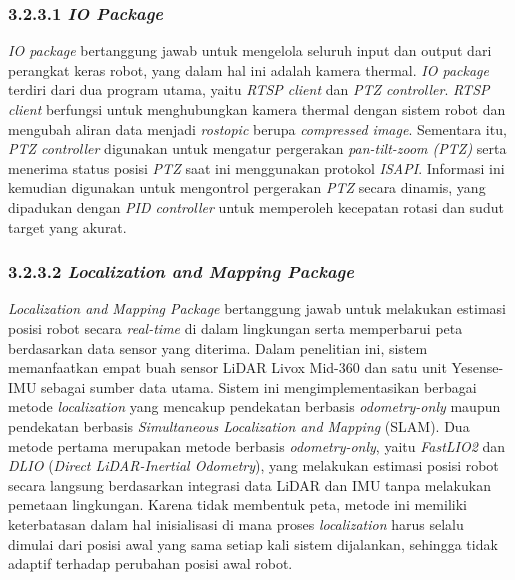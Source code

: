 \subsubsection{3.2.3.1 \emph{IO Package}}
\textit{IO package} bertanggung jawab untuk mengelola seluruh input dan output dari perangkat keras robot, yang dalam hal ini adalah kamera thermal. \textit{IO package} terdiri dari dua program utama, yaitu \textit{RTSP client} dan \textit{PTZ controller}.  \textit{RTSP client} berfungsi untuk menghubungkan kamera thermal dengan sistem robot dan mengubah aliran data menjadi \textit{rostopic} berupa \textit{compressed image}. Sementara itu, \textit{PTZ controller} digunakan untuk mengatur pergerakan \textit{pan-tilt-zoom (PTZ)} serta menerima status posisi \emph{PTZ} saat ini menggunakan protokol \emph{ISAPI}. Informasi ini kemudian digunakan untuk mengontrol pergerakan \emph{PTZ} secara dinamis, yang dipadukan dengan \textit{PID controller} untuk memperoleh kecepatan rotasi dan sudut target yang akurat.

\subsubsection{3.2.3.2 \emph{Localization and Mapping Package}}
\emph{Localization and Mapping Package} bertanggung jawab untuk melakukan estimasi posisi robot secara \emph{real-time} di dalam lingkungan serta memperbarui peta berdasarkan data sensor yang diterima. Dalam penelitian ini, sistem memanfaatkan empat buah sensor LiDAR Livox Mid-360 dan satu unit Yesense-IMU sebagai sumber data utama. Sistem ini mengimplementasikan berbagai metode \emph{localization} yang mencakup pendekatan berbasis \emph{odometry-only} maupun pendekatan berbasis \emph{Simultaneous Localization and Mapping} (SLAM). Dua metode pertama merupakan metode berbasis \emph{odometry-only}, yaitu \emph{FastLIO2} dan \emph{DLIO} (\emph{Direct LiDAR-Inertial Odometry}), yang melakukan estimasi posisi robot secara langsung berdasarkan integrasi data LiDAR dan IMU tanpa melakukan pemetaan lingkungan. Karena tidak membentuk peta, metode ini memiliki keterbatasan dalam hal inisialisasi di mana proses \emph{localization} harus selalu dimulai dari posisi awal yang sama setiap kali sistem dijalankan, sehingga tidak adaptif terhadap perubahan posisi awal robot. 

